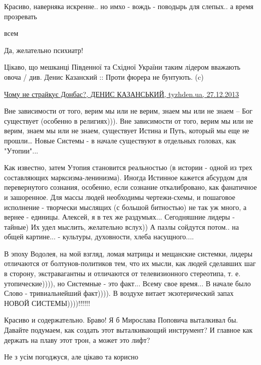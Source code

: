\begin{itemize}
Красиво, наверняка искренне.. но имхо - вождь - поводырь для слепых.. а время прозревать

всем

Да, желательно психиатр!


Цікаво, що мешканці Південної та Східної України таким лідером вважають овоча /
див. Денис Казанский :: Проти фюрера не бунтують. (c) 

\href{http://tyzhden.ua/Society/97204}{%
Чому не страйкує Донбас?, ДЕНИС КАЗАНСЬКИЙ, tyzhden.ua, 27.12.2013%
}


Вне зависимости от того, верим мы или не верим, знаем мы или не знаем – Бог
существует (особенно в религиях))). Вне зависимости от того, верим мы или не
верим, знаем мы или не знаем, существует Истина и Путь, который мы еще не
прошли… Новые Системы - в начале существуют в отдельных головах, как
"Утопии"... 

Как известно, затем Утопия становится реальностью (в истории - одной из трех
составляющих марксизма-ленинизма). Иногда Истинное кажется абсурдом для
перевернутого сознания, особенно, если сознание откалибровано, как фанатичное и
зашоренное. Для массы людей необходимы чертежи-схемы, и пошаговое исполнение -
творчески мыслящих (с большой битностью) не так уж много, а вернее - единицы.
Алексей, я в тех же раздумьях... Сегодняшние лидеры - тайные) Их удел мыслить,
желательно вслух)) А пазлы сойдутся потом.. на общей картине... - культуры,
духовности, хлеба насущного.... 

В эпоху Водолея, на мой взгляд, ломая матрицы и мещанские системки, лидеры
отличаются от болтунов-политиков тем, что их мысли, как людей сделавших шаг в
сторону, экстравагантны и отличаются от телевизионного стереотипа, т. е.
утопические)))), но Системные - это факт...  Всему свое время... В начале было
Слово - тривиальнейший факт)))). В воздухе витает экзотерический запах НОВОЙ
СИСТЕМЫ))))!!!!!!


Красиво и содержательно. Браво! Я б Мирослава Поповича выталкивал бы. Давайте
подумаем, как создать этот выталкивающий инструмент? И главное как держать на
плаву этот трон, а может это лифт?

Не з усім погоджуся, але цікаво та корисно


\end{itemize}
